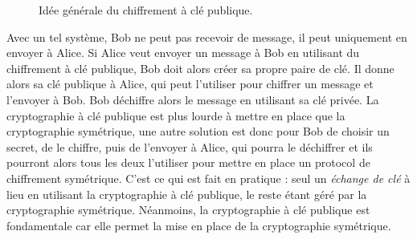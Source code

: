 \begin{figure}[h]
  \caption{Idée générale du chiffrement à clé publique.}
  \label{fig:crypto-asym}
\end{figure}
Avec un tel système, Bob ne peut pas recevoir de message, il peut uniquement en
envoyer à Alice. Si Alice veut envoyer un message à Bob en utilisant du
chiffrement à clé publique, Bob doit alors créer sa propre paire de clé. Il
donne alors sa clé publique à Alice, qui peut l'utiliser pour chiffrer un
message et l'envoyer à Bob. Bob déchiffre alors le message en utilisant sa clé
privée. La cryptographie à clé publique est plus lourde à mettre en place que la
cryptographie symétrique, une autre solution est donc pour Bob de choisir un
secret, de le chiffre, puis de l'envoyer à Alice, qui pourra le déchiffrer et
ils pourront alors tous les deux l'utiliser pour mettre en place un protocol de
chiffrement symétrique. C'est ce qui est fait en pratique : seul un
\emph{échange de clé} à lieu en utilisant la cryptographie à clé publique, le
reste étant géré par la cryptographie symétrique. Néanmoins, la cryptographie à
clé publique est fondamentale car elle permet la mise en place de la
cryptographie symétrique.

